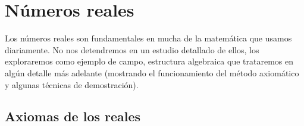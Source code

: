 %

\chapter{Números reales}
\label{cha:numeros-reales}

  Los números reales son fundamentales en mucha de la matemática
  que usamos diariamente.
  No nos detendremos en un estudio detallado de ellos,
  los exploraremos como ejemplo de campo,
  estructura algebraica que trataremos en algún detalle más adelante
  (mostrando el funcionamiento del método axiomático
   y algunas técnicas de demostración).

\section{Axiomas de los reales}
\label{sec:axiomas-reales}


